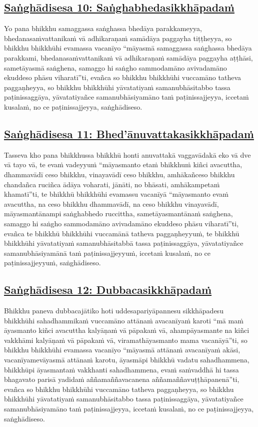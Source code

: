 \subsection*{\hyperref[comm10]{Saṅghādisesa 10: Saṅghabhedasikkhāpadaṁ}}
\label{sd10}
Yo pana bhikkhu samaggassa saṅghassa bhedāya parakkameyya, bhedanasaṁvattanikaṁ vā adhikaraṇaṁ samādāya paggayha tiṭṭheyya, so bhikkhu bhikkhūhi evamassa vacanīyo “māyasmā samaggassa saṅghassa bhedāya parakkami, bhedanasaṁvattanikaṁ vā adhikaraṇaṁ samādāya paggayha aṭṭhāsi, sametāyasmā saṅghena, samaggo hi saṅgho sammodamāno avivadamāno ekuddeso phāsu viharatī”ti, evañca so bhikkhu bhikkhūhi vuccamāno tatheva paggaṇheyya, so bhikkhu bhikkhūhi yāvatatiyaṁ samanubhāsitabbo tassa paṭinissaggāya, yāvatatiyañce samanubhāsiyamāno taṁ paṭinissajjeyya, iccetaṁ kusalaṁ, no ce paṭinissajjeyya, saṅghādiseso.

\subsection*{\hyperref[comm11]{Saṅghādisesa 11: Bhed'ānuvattakasikkhāpadaṁ}}
\label{sd11}
Tasseva kho pana bhikkhussa bhikkhū honti anuvattakā vaggavādakā eko vā dve vā tayo vā, te evaṁ vadeyyuṁ “māyasmanto etaṁ bhikkhuṁ kiñci avacuttha, dhammavādī ceso bhikkhu, vinayavādī ceso bhikkhu, amhākañceso bhikkhu chandañca ruciñca ādāya voharati, jānāti, no bhāsati, amhākampetaṁ khamatī”ti, te bhikkhū bhikkhūhi evamassu vacanīyā “māyasmanto evaṁ avacuttha, na ceso bhikkhu dhammavādī, na ceso bhikkhu vinayavādī, māyasmantānampi saṅghabhedo ruccittha, sametāyasmantānaṁ saṅghena, samaggo hi saṅgho sammodamāno avivadamāno ekuddeso phāsu viharatī”ti, evañca te bhikkhū bhikkhūhi vuccamānā tatheva paggaṇheyyuṁ, te bhikkhū bhikkhūhi yāvatatiyaṁ samanubhāsitabbā tassa paṭinissaggāya, yāvatatiyañce samanubhāsiyamānā taṁ paṭinissajjeyyuṁ, iccetaṁ kusalaṁ, no ce paṭinissajjeyyuṁ, saṅghādiseso.

\subsection*{\hyperref[comm12]{Saṅghādisesa 12: Dubbacasikkhāpadaṁ}}
\label{sd12}
Bhikkhu paneva dubbacajātiko hoti uddesapariyāpannesu sikkhāpadesu bhikkhūhi sahadhammikaṁ vuccamāno attānaṁ avacanīyaṁ karoti “mā maṁ āyasmanto kiñci avacuttha kalyāṇaṁ vā pāpakaṁ vā, ahampāyasmante na kiñci vakkhāmi kalyāṇaṁ vā pāpakaṁ vā, viramathāyasmanto mama vacanāyā”ti, so bhikkhu bhikkhūhi evamassa vacanīyo “māyasmā attānaṁ avacanīyaṁ akāsi, vacanīyamevāyasmā attānaṁ karotu, āyasmāpi bhikkhū vadatu sahadhammena, bhikkhūpi āyasmantaṁ vakkhanti sahadhammena, evaṁ saṁvaddhā hi tassa bhagavato parisā yadidaṁ aññamaññavacanena aññamaññavuṭṭhāpanenā”ti, evañca so bhikkhu bhikkhūhi vuccamāno tatheva paggaṇheyya, so bhikkhu bhikkhūhi yāvatatiyaṁ samanubhāsitabbo tassa paṭinissaggāya, yāvatatiyañce samanubhāsiyamāno taṁ paṭinissajjeyya, iccetaṁ kusalaṁ, no ce paṭinissajjeyya, saṅghādiseso.

